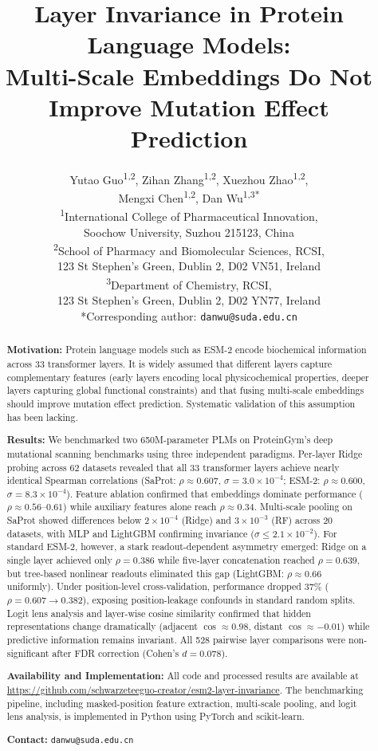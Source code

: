 \documentclass[11pt,a4paper]{article}
\title{\LARGE\bfseries Layer Invariance in Protein Language Models:\\Multi-Scale Embeddings Do Not Improve Mutation Effect Prediction}
\author{
\large
Yutao Guo\textsuperscript{1,2}, Zihan Zhang\textsuperscript{1,2}, Xuezhou Zhao\textsuperscript{1,2},\\[2pt]
Mengxi Chen\textsuperscript{1,2}, Dan Wu\textsuperscript{1,3*}\\[8pt]
\small
\textsuperscript{1}International College of Pharmaceutical Innovation,\\
\hspace*{1em}Soochow University, Suzhou 215123, China\\[4pt]
\textsuperscript{2}School of Pharmacy and Biomolecular Sciences, RCSI,\\
\hspace*{1em}123 St Stephen's Green, Dublin 2, D02 VN51, Ireland\\[4pt]
\textsuperscript{3}Department of Chemistry, RCSI,\\
\hspace*{1em}123 St Stephen's Green, Dublin 2, D02 YN77, Ireland\\[8pt]
*Corresponding author: \texttt{danwu@suda.edu.cn}
}
\date{}
\begin{document}
\maketitle

\begin{abstract}
\textbf{Motivation:} Protein language models such as ESM-2 encode biochemical information across
33 transformer layers. It is widely assumed that different layers capture complementary
features (early layers encoding local physicochemical properties, deeper layers capturing
global functional constraints) and that fusing multi-scale embeddings should improve
mutation effect prediction. Systematic validation of this assumption has been lacking.

\textbf{Results:} We benchmarked two 650M-parameter PLMs on ProteinGym's deep
mutational scanning benchmarks using three independent paradigms. Per-layer Ridge
probing across 62 datasets revealed that all 33 transformer layers achieve nearly
identical Spearman correlations (SaProt: $\rho \approx 0.607$, $\sigma = 3.0 \times 10^{-4}$;
ESM-2: $\rho \approx 0.600$, $\sigma = 8.3 \times 10^{-4}$). Feature ablation confirmed
that embeddings dominate performance ($\rho \approx 0.56$--$0.61$) while auxiliary
features alone reach $\rho \approx 0.34$. Multi-scale pooling on SaProt showed
differences below $2 \times 10^{-4}$ (Ridge) and $3 \times 10^{-3}$ (RF) across 20
datasets, with MLP and LightGBM confirming invariance ($\sigma \le 2.1 \times 10^{-2}$).
For standard ESM-2, however, a stark readout-dependent asymmetry emerged: Ridge on
a single layer achieved only $\rho = 0.386$ while five-layer concatenation reached
$\rho = 0.639$, but tree-based nonlinear readouts eliminated this gap (LightGBM:
$\rho \approx 0.66$ uniformly). Under position-level cross-validation, performance
dropped 37\% ($\rho = 0.607 \rightarrow 0.382$), exposing position-leakage confounds
in standard random splits. Logit lens analysis and layer-wise cosine similarity
confirmed that hidden representations change dramatically (adjacent $\cos \approx 0.98$,
distant $\cos \approx -0.01$) while predictive information remains invariant.
All 528 pairwise layer comparisons were non-significant after FDR correction
(Cohen's $d = 0.078$).

\textbf{Availability and Implementation:} All code and processed results are available at
\url{https://github.com/schwarzeteeguo-creator/esm2-layer-invariance}. The benchmarking pipeline, including masked-position
feature extraction, multi-scale pooling, and logit lens analysis, is implemented in Python
using PyTorch and scikit-learn.

\textbf{Contact:} \texttt{danwu@suda.edu.cn}
\end{abstract}
\end{document}
